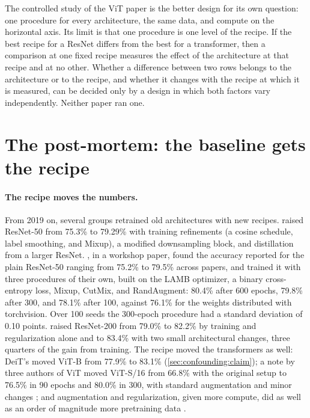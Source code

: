 \begin{refsection}
The controlled study of the ViT paper is the better design for its own question: one procedure for every architecture, the same data, and compute on the horizontal axis. Its limit is that one procedure is one level of the recipe. If the best recipe for a ResNet differs from the best for a transformer, then a comparison at one fixed recipe measures the effect of the architecture at that recipe and at no other. Whether a difference between two rows belongs to the architecture or to the recipe, and whether it changes with the recipe at which it is measured, can be decided only by a design in which both factors vary independently. Neither paper ran one.

\section{The post-mortem: the baseline gets the recipe}\label{sec:confounding:postmortem}

\paragraph{The recipe moves the numbers.} From 2019 on, several groups retrained old architectures with new recipes. \Textcite{HeEtAl2019} raised ResNet-50 from 75.3\% to 79.29\% with training refinements (a cosine schedule, label smoothing, and Mixup), a modified downsampling block, and distillation from a larger ResNet. \Textcite{WightmanTouvronJegou2021}, in a workshop paper, found the accuracy reported for the plain ResNet-50 ranging from 75.2\% to 79.5\% across papers, and trained it with three procedures of their own, built on the LAMB optimizer, a binary cross-entropy loss, Mixup, CutMix, and RandAugment: 80.4\% after 600 epochs, 79.8\% after 300, and 78.1\% after 100, against 76.1\% for the weights distributed with torchvision. Over 100 seeds the 300-epoch procedure had a standard deviation of 0.10 points. \Textcite{BelloEtAl2021} raised ResNet-200 from 79.0\% to 82.2\% by training and regularization alone and to 83.4\% with two small architectural changes, three quarters of the gain from training. The recipe moved the transformers as well: DeiT's moved ViT-B from 77.9\% to 83.1\% (\cref{sec:confounding:claim}); a note by three authors of ViT moved ViT-S/16 from 66.8\% with the original setup to 76.5\% in 90 epochs and 80.0\% in 300, with standard augmentation and minor changes \parencite{BeyerZhaiKolesnikov2022}; and augmentation and regularization, given more compute, did as well as an order of magnitude more pretraining data \parencite{SteinerEtAl2022}.


\end{refsection}
